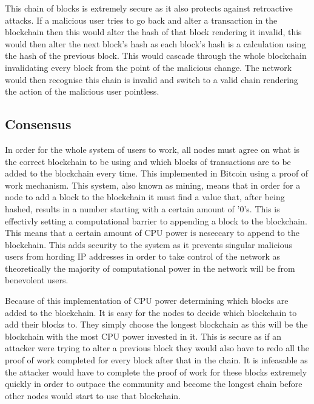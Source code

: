 \documentclass{l4proj}
\begin{document}
This chain of blocks is extremely secure as it also protects against retroactive attacks. If a malicious user tries
to go back and alter a transaction in the blockchain then this would alter the hash of that block rendering it invalid,
this would then alter the next block's hash as each block's hash is a calculation using the hash of the previous block.
This would cascade through the whole blockchain invalidating every block from the point of the malicious change. The 
network would then recognise this chain is invalid and switch to a valid chain rendering the action of the malicious
user pointless.

\subsection{Consensus}
In order for the whole system of users to work, all nodes must agree on what is the correct blockchain to be using and
which blocks of transactions are to be added to the blockchain every time. This implemented in Bitcoin using a proof of
work mechanism. This system, also known as mining, means that in order for a node to add a block to the blockchain it
must find a value that, after being hashed, results in a number starting with a certain amount of '0's. This is 
effectivly setting a computational barrier to appending a block to the blockchain. This means that a certain amount of
CPU power is neseccary to append to the blockchain. This adds security to the system as it prevents singular malicious
users from hording IP addresses in order to take control of the network as theoretically the majority of computational
power in the network will be from benevolent users.

Because of this implementation of CPU power determining which blocks are added to the blockchain. It is easy for the
nodes to decide which blockchain to add their blocks to. They simply choose the longest blockchain as this will be
the blockchain with the most CPU power invested in it. This is secure as if an attacker were trying to alter a 
previous block they would also have to redo all the proof of work completed for every block after that in the chain.
It is infeasable as the attacker would have to complete the proof of work for these blocks extremely quickly in order
to outpace the community and become the longest chain before other nodes would start to use that blockchain.
\end{document}
